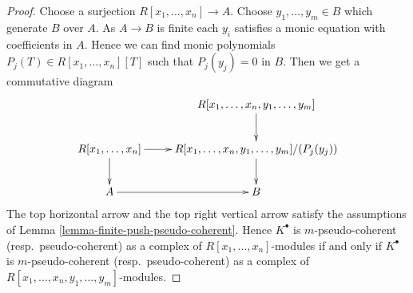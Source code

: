 \documentclass[10pt,a4paper]{amsart}
\theoremstyle{plain}
\theoremstyle{definition}
\theoremstyle{remark}
\numberwithin{equation}{subsection}
\begin{document}
\begin{proof}
Choose a surjection $R[x_1, \ldots, x_n] \to A$.
Choose $y_1, \ldots, y_m \in B$ which generate $B$ over $A$.
As $A \to B$ is finite each $y_i$ satisfies a monic equation with
coefficients in $A$. Hence we can find monic polynomials
$P_j(T) \in R[x_1, \ldots, x_n][T]$ such that $P_j(y_j) = 0$ in $B$.
Then we get a commutative diagram
$$
\xymatrix{
& R[x_1, \ldots, x_n, y_1, \ldots, y_m] \ar[d] \\
R[x_1, \ldots, x_n] \ar[d] \ar[r] &
R[x_1, \ldots, x_n, y_1, \ldots, y_m]/(P_j(y_j)) \ar[d] \\
A \ar[r] & B
}
$$
The top horizontal arrow and the top right vertical arrow
satisfy the assumptions of
Lemma \ref{lemma-finite-push-pseudo-coherent}.
Hence $K^\bullet$ is $m$-pseudo-coherent (resp.\ pseudo-coherent) as a complex
of $R[x_1, \ldots, x_n]$-modules if and only if $K^\bullet$ is
$m$-pseudo-coherent (resp.\ pseudo-coherent) as a complex of
$R[x_1, \ldots, x_n, y_1, \ldots, y_m]$-modules.
\end{proof}
\end{document}

